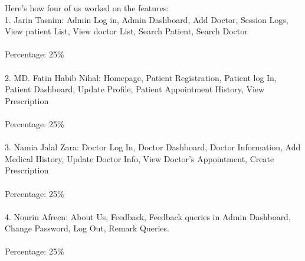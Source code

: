 \documentclass[14pt,a4paper,calibribody]{article}
\begin{document}
Here’s how four of us worked on the features: \\
1. Jarin Tasnim: Admin Log in, Admin Dashboard, Add Doctor, Session Logs, View patient List, View doctor List, Search Patient, Search Doctor\\\\
Percentage: 25\%\\\\ 
2. MD. Fatin Habib Nihal: Homepage, Patient Registration, Patient log In, Patient Dashboard, Update Profile, Patient Appointment History, View Prescription\\\\
Percentage: 25\%\\\\ 
3. Namia Jalal Zara: Doctor Log In, Doctor Dashboard, Doctor Information, Add Medical History, Update Doctor Info, View Doctor’s Appointment, Create Prescription\\\\
Percentage: 25\%\\\\ 
4. Nourin Afreen: About Us, Feedback, Feedback queries in Admin Dashboard, Change Password, Log Out, Remark Queries.\\\\
Percentage: 25\%
\end{document}
